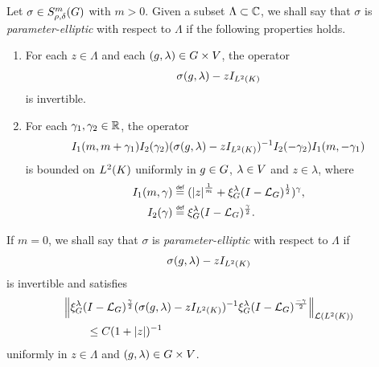 \begin{definition}
\label{definition:parameter-ellipticity}
    Let $\sigma \in \SymbolClass m {\rho, \delta}$ with $m > 0$.
    Given a subset $\Lambda \subset \C$,
    we shall say that $\sigma$ is \emph{parameter-elliptic} with respect to $\Lambda$
    if the following properties holds.
    \begin{enumerate}
        \item For each $z \in \Lambda$ and each $(g, \lambda) \in \Group \times \VectorSpace$,
            the operator
            \begin{align*}
                \sigma(g, \lambda) - z \Id {\Lebesgue 2 \CompactGroup}
            \end{align*}
            is invertible.
        \item
            For each $\gamma_1, \gamma_2 \in \R$,
            the operator
            \begin{align*}
                I_1(m, m + \gamma_1)
                I_2(\gamma_2)
                (\sigma(g, \lambda) - z \Id {\Lebesgue 2 \CompactGroup})^{-1}
                I_2(-\gamma_2)
                I_1(m, -\gamma_1)
            \end{align*}
            is bounded on $\Lebesgue 2 \CompactGroup$ uniformly in $g \in \Group$, $\lambda \in \VectorSpace$ and $z \in \lambda$,
            where
            \begin{align}
                I_1(m, \gamma) &\defeq (\abs z^{\frac 1 m} + \Rep \lambda \BesselPotential 1)^\gamma,\\
                I_2(\gamma) &\defeq \Rep \lambda \BesselPotential \gamma.
                \label{eq:operators_for_parameter-ellipticity}
            \end{align}
    \end{enumerate}

    If $m = 0$,
    we shall say that $\sigma$ is \emph{parameter-elliptic} with respect to $\Lambda$ if
    \begin{align*}
        \sigma(g, \lambda) - z \Id {\Lebesgue 2 \CompactGroup}
    \end{align*}
    is invertible and satisfies
    \begin{align*}
        &\norm [\Lin {\Lebesgue 2 \CompactGroup}] {
            \Rep \lambda \BesselPotential \gamma
            (\sigma(g, \lambda) - z \Id {\Lebesgue 2 \CompactGroup})^{-1}
            \Rep \lambda \BesselPotential {-\gamma}
        }\\
        &\qquad \leq C(1 + \abs z)^{-1}
    \end{align*}
    uniformly in $z \in \Lambda$ and $(g, \lambda) \in \Group \times \VectorSpace$.
\end{definition}


